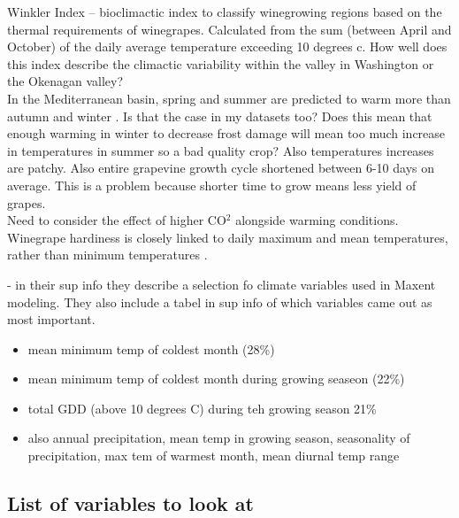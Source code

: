 \documentclass[11pt,letter]{article}
\begin{document}
Winkler Index – bioclimactic index to classify winegrowing regions based on the thermal requirements of winegrapes. Calculated from the sum (between April and October) of the daily average temperature  exceeding 10 degrees c. How well does this index describe the climactic variability within the valley in Washington or the Okenagan valley? \\

In the Mediterranean basin, spring and summer are predicted to warm more than autumn and winter \citep{Ferrise2016}. Is that the case in my datasets too? Does this mean that enough warming in winter to decrease frost damage will mean too much increase in temperatures in summer so a bad quality crop? Also temperatures increases are patchy. Also entire grapevine growth cycle shortened between 6-10 days on average. This is a problem because shorter time to grow means less yield of grapes. \\

Need to consider the effect of higher CO$^2$ alongside warming conditions. \\

Winegrape hardiness is closely linked to daily maximum and mean temperatures, rather than minimum temperatures \citep{Hubackova1996}. 

\cite{Hannah2013} - in their sup info they describe a selection fo climate variables used in Maxent modeling. They also include a tabel in sup info of which variables came out as most important. 
\begin{itemize} 
	\item mean minimum temp of coldest month (28\%)
	\item mean minimum temp of coldest month during growing seaseon (22\%)
	\item total GDD (above 10 degrees C) during teh growing season {21\%}
	\item also annual precipitation, mean temp in growing season, seasonality of precipitation, max tem of warmest month, mean diurnal temp range 
\end{itemize}


\subsection{List of variables to look at}
\end{document}
